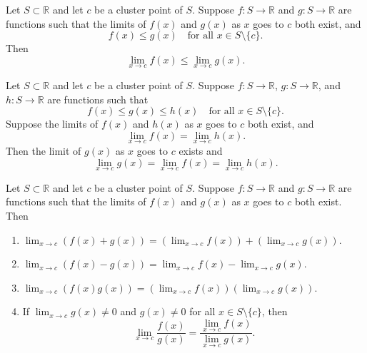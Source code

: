 \documentclass[../main.tex]{subfiles}
\begin{document}
    
    
    
    \begin{proposition}
        Let $S \subset \mathbb{R}$ and let $c$ be a cluster point of $S$. Suppose $f : S \to \mathbb{R}$ and $g : S \to \mathbb{R}$ are functions such that the limits of $f(x)$ and $g(x)$ as $x$ goes to $c$ both exist, and
        \[
        f(x) \leq g(x) \quad \text{for all } x \in S \setminus \{c\}.
        \]
        Then
        \[
        \lim_{x\to c} f(x) \leq \lim_{x\to c} g(x).
        \]
    \end{proposition}
        
    \begin{proposition}
        Let $S \subset \mathbb{R}$ and let $c$ be a cluster point of $S$. Suppose $f : S \to \mathbb{R}$, $g : S \to \mathbb{R}$, and $h : S \to \mathbb{R}$ are functions such that
        \[
        f(x) \leq g(x) \leq h(x) \quad \text{for all } x \in S \setminus \{c\}.
        \]
        Suppose the limits of $f(x)$ and $h(x)$ as $x$ goes to $c$ both exist, and
        \[
        \lim_{x\to c} f(x) = \lim_{x\to c} h(x).
        \]
        Then the limit of $g(x)$ as $x$ goes to $c$ exists and
        \[
        \lim_{x\to c} g(x) = \lim_{x\to c} f(x) = \lim_{x\to c} h(x).
        \]
    \end{proposition}
        
    \begin{proposition}
        Let $S \subset \mathbb{R}$ and let $c$ be a cluster point of $S$. Suppose $f : S \to \mathbb{R}$ and $g : S \to \mathbb{R}$ are functions such that the limits of $f(x)$ and $g(x)$ as $x$ goes to $c$ both exist. Then
    \begin{enumerate}
        \item $\lim_{x\to c} (f(x) + g(x)) = \left(\lim_{x\to c} f(x)\right) + \left(\lim_{x\to c} g(x)\right)$.
        \item $\lim_{x\to c} (f(x) - g(x)) = \lim_{x\to c} f(x) - \lim_{x\to c} g(x)$.
        \item $\lim_{x\to c} (f(x)g(x)) = \left(\lim_{x\to c} f(x)\right) \left(\lim_{x\to c} g(x)\right)$.
        \item If $\lim_{x\to c} g(x) \neq 0$ and $g(x) \neq 0$ for all $x \in S \setminus \{c\}$, then
            \[
            \lim_{x\to c} \frac{f(x)}{g(x)} = \frac{\lim_{x\to c} f(x)}{\lim_{x\to c} g(x)}.
            \]
    \end{enumerate}
    \end{proposition}
        
\end{document}
